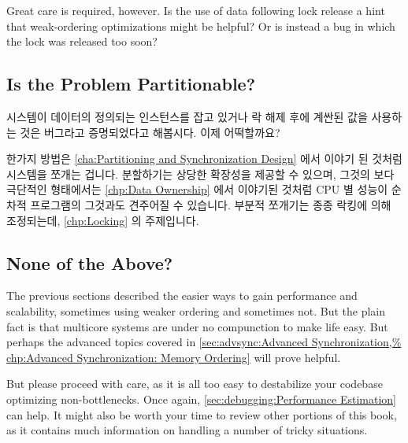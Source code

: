 Great care is required, however.
Is the use of data following lock release a hint that weak-ordering
optimizations might be helpful?
Or is instead a bug in which the lock was released too soon?

\fi

\subsection{Is the Problem Partitionable?}
\label{sec:app:questions:Is the Problem Partitionable?}

시스템이 데이터의 정의되는 인스턴스를 잡고 있거나 락 해제 후에 계싼된 값을
사용하는 것은 버그라고 증명되었다고 해봅시다.
이제 어떡할까요?

한가지 방법은
\cref{cha:Partitioning and Synchronization Design}
에서 이야기 된 것처럼 시스템을 쪼개는 겁니다.
분할하기는 상당한 확장성을 제공할 수 있으며, 그것의 보다 극단적인 형태에서는
\cref{chp:Data Ownership} 에서 이야기된 것처럼 CPU 별 성능이 순차적 프로그램의
그것과도 견주어질 수 있습니다.
부분적 쪼개기는 종종 락킹에 의해 조정되는데,
\cref{chp:Locking} 의 주제입니다.

\iffalse

Suppose that the system holds the defining instance of the data,
or that using a computed value past lock release proved to be a bug.
What then?

One approach is to partition the system, as discussed in
\cref{cha:Partitioning and Synchronization Design}.
Partititioning can provide excellent scalability and in its more
extreme form, per-CPU performance rivaling that of a sequential program,
as discussed in \cref{chp:Data Ownership}.
Partial partitioning is often mediated by locking, which is the subject of
\cref{chp:Locking}.

\fi

\subsection{None of the Above?}
\label{sec:app:questions:None of the Above?}

The previous sections described the easier ways to gain performance
and scalability, sometimes using weaker ordering and sometimes not.
But the plain fact is that multicore systems are under no compunction
to make life easy.
But perhaps the advanced topics covered in
\cref{sec:advsync:Advanced Synchronization,%
chp:Advanced Synchronization: Memory Ordering}
will prove helpful.

But please proceed with care, as it is all too easy to destabilize
your codebase optimizing non-bottlenecks.
Once again, \cref{sec:debugging:Performance Estimation} can help.
It might also be worth your time to review other portions of this
book, as it contains much information on handling a number of tricky
situations.
